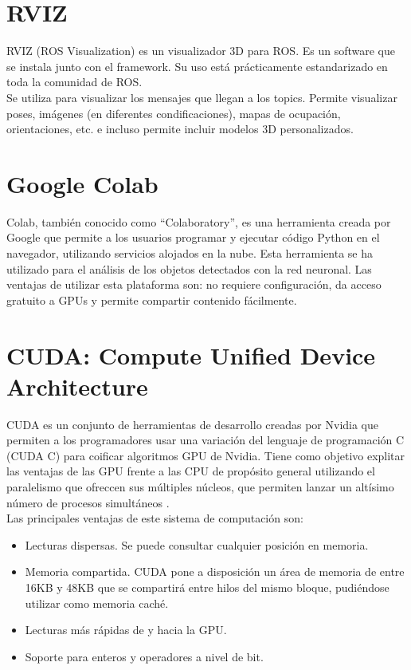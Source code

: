 \section{RVIZ}

RVIZ (ROS Visualization) es un visualizador 3D para ROS. Es un software que se instala junto con el framework. Su uso está prácticamente estandarizado en toda la comunidad de ROS.\\

Se utiliza para visualizar los mensajes que llegan a los topics. Permite visualizar poses, imágenes (en diferentes condificaciones),  mapas de ocupación, orientaciones, etc. e incluso permite incluir modelos 3D personalizados.\\

\section{Google Colab}

Colab, también conocido como ``Colaboratory'', es una herramienta creada por Google que permite a los usuarios programar y ejecutar código Python en el navegador, utilizando servicios alojados en la nube. Esta herramienta se ha utilizado para el análisis de los objetos detectados con la red neuronal. Las ventajas de utilizar esta plataforma son: no requiere configuración, da acceso gratuito a GPUs y permite compartir contenido fácilmente.\\

\section{CUDA: Compute Unified Device Architecture} \label{apendA.cuda}

CUDA es un conjunto de herramientas de desarrollo creadas por Nvidia que permiten a los programadores usar una variación del lenguaje de programación C (CUDA C) para coificar algoritmos GPU de Nvidia. Tiene como objetivo explitar las ventajas de las GPU frente a las CPU de propósito general utilizando el paralelismo que ofreccen sus múltiples núcleos, que permiten lanzar un altísimo número de procesos simultáneos \cite{cuda}.\\

Las principales ventajas de este sistema de computación son:

\begin{itemize}

	\item Lecturas dispersas. Se puede consultar cualquier posición en memoria.
	\item Memoria compartida. CUDA pone a disposición un área de memoria de entre 16KB y 48KB que se compartirá entre hilos del mismo bloque, pudiéndose utilizar como memoria caché.
	\item Lecturas más rápidas de y hacia la GPU.
	\item Soporte para enteros y operadores a nivel de bit.

\end{itemize}

